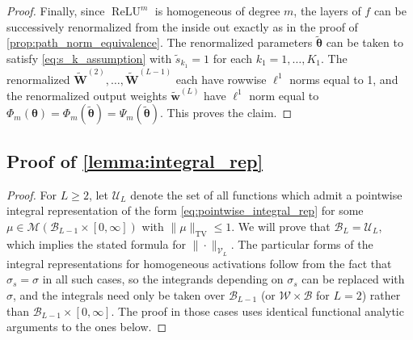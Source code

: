 \documentclass{article}
\DeclareMathOperator{\TV}{TV}
\DeclareMathOperator{\ReLU}{\mathrm{ReLU}}
\def\vtheta{{\bm{\theta}}}
\def\vw{{\bm{w}}}
\def\mW{{\bm{W}}}
\def\cB{{\mathcal{B}}}
\def\cM{{\mathcal{M}}}
\def\cU{{\mathcal{U}}}
\def\cV{{\mathcal{V}}}
\def\cW{{\mathcal{W}}}
\begin{document}
\begin{appendices}
\begin{proof}
    Finally, since $\ReLU^m$ is homogeneous of degree $m$, the layers of $f$ can be successively renormalized from the inside out exactly as in the proof of \cref{prop:path_norm_equivalence}. The renormalized parameters $\widetilde{\vtheta}$ can be taken to satisfy \eqref{eq:s_k_assumption} with $\widetilde{s}_{k_1} = 1$ for each $k_1 = 1, \dots, K_1$. The renormalized $\widetilde{\mW}^{(2)}, \dots, \widetilde{\mW}^{(L-1)}$ each have rowwise $\ell^1$ norms equal to 1, and the renormalized output weights $\widetilde{\vw}^{(L)}$ have $\ell^1$ norm equal to $\Phi_m(\vtheta) = \Phi_m (\widetilde{\vtheta}) = \Psi_m(\widetilde{\vtheta})$. This proves the claim.
\end{proof}



\subsection{Proof of \cref{lemma:integral_rep}} \label{appendix:proof_integral_rep}

\begin{proof}
    For $L \geq 2$, let $\cU_L$ denote the set of all functions which admit a pointwise integral representation of the form \eqref{eq:pointwise_integral_rep} for some $\mu \in \cM(\cB_{L-1} \times [0,\infty])$ with $\| \mu \|_{\TV} \leq 1$. We will prove that $\cB_L = \cU_L$, which implies the stated formula for $\| \cdot \|_{\cV_L}$. The particular forms of the integral representations for homogeneous activations follow from the fact that $\sigma_s = \sigma$ in all such cases, so the integrands depending on $\sigma_s$ can be replaced with $\sigma$, and the integrals need only be taken over $\cB_{L-1}$ (or $\cW \times \cB$ for $L = 2$) rather than $\cB_{L-1} \times [0,\infty]$. The proof in those cases uses identical functional analytic arguments to the ones below.
    

\end{proof}
\end{appendices}
\end{document}
